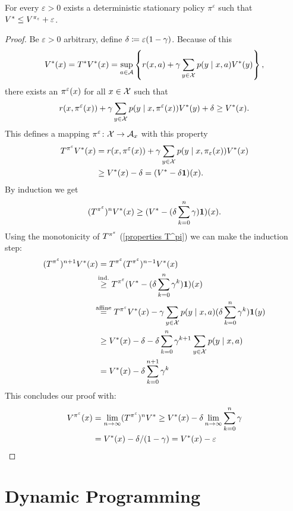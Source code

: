 \begin{prop}\label{epsilon optimal}
	For every \(\varepsilon>0\) exists a deterministic stationary policy \(\pi^\varepsilon\) such that \(V^* \le V^{\pi_\varepsilon}+\varepsilon \).
\end{prop}
\begin{proof}
	Be \(\varepsilon>0 \) arbitrary,  define \(\delta\coloneqq \varepsilon (1-\gamma) \). Because of this
	\[
		V^*(x)=T^*V^*(x)=\sup_{a\in\mathcal{A}}
		\left\{r(x,a)+\gamma\sum_{y\in\mathcal{X}}p(y\mid x,a)V^*(y) \right\},
	\]
	there exists an \(\pi^\varepsilon(x)\) for all \(x\in\mathcal{X}\) such that
	\begin{align}\label{epsilon optimal policy}
		r(x,\pi^\varepsilon(x))+\gamma\sum_{y\in\mathcal{X}}p(y\mid x,\pi^\varepsilon(x))V^*(y) + \delta \ge V^*(x).
	\end{align}
	This defines a mapping \(\pi^\varepsilon\colon \mathcal{X}\to\mathcal{A}_x\) with this property
	\begin{align*}
		T^{\pi^\varepsilon} V^*(x)
		&=r(x,\pi^\varepsilon(x))+\gamma \sum_{y\in\mathcal{X}}p(y\mid x,\pi_\varepsilon(x)) V^*(x)\\
		&\ge V^*(x) -\delta = (V^* -\delta \mathbf{1}) (x).
	\end{align*}
	By induction we get 
	\[
		(T^{\pi^\varepsilon})^n V^*(x)\ge (V^*-(\delta\sum_{k=0}^n\gamma) \mathbf{1}) (x).
	\] 
	Using the monotonicity of \(T^{\pi^\varepsilon}\) (\ref{properties T^pi}) we can make the induction step:
	\begin{align*}
		(T^{\pi^\vep})^{n+1} V^*(x)
		&=T^{\pi^\vep} (T^{\pi^\vep})^{n-1} V^*(x)\\
		&\lxgq{\text{ind.}} T^{\pi^\vep} (V^*-(\delta\sum_{k=0}^n\gamma^k) \mathbf{1})(x)\\
		&\lxeq{\text{affine}} T^{\pi^\vep} V^*(x) - \gamma \sum_{y\in\cX} p(y\mid x, a) (\delta\sum_{k=0}^n\gamma^k) \mathbf{1}(y)\\
		&\ge V^*(x)-\delta - \delta\sum_{k=0}^n\gamma^{k+1} \sum_{y\in\cX} p(y\mid x,a)\\
		&=V^*(x)-\delta \sum_{k=0}^{n+1}\gamma^k
	\end{align*}
	This concludes our proof with:
	\begin{align*}
		V^{\pi^\varepsilon}(x)&=\lim_{n\to\infty} (T^{\pi^\varepsilon})^n V^* 
		\ge V^*(x)-\delta\lim_{n\to\infty}\sum_{k=0}^n\gamma\\
		&=V^*(x)-\delta/(1-\gamma)=V^*(x)-\varepsilon \qedhere
	\end{align*}
\end{proof}


\section{Dynamic Programming}

